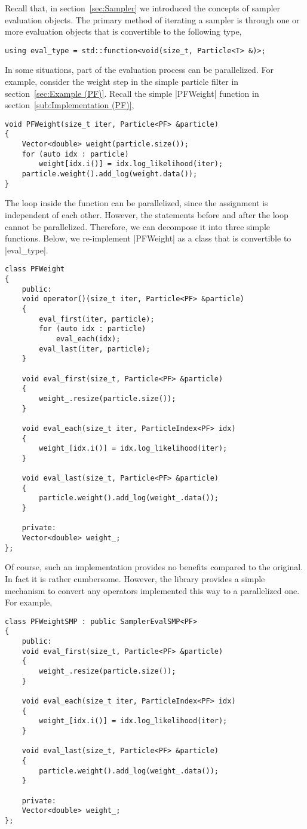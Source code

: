 Recall that, in section~\ref{sec:Sampler} we introduced the concepts of sampler
evaluation objects. The primary method of iterating a sampler is through
one or more evaluation objects that is convertible to the following type,
\begin{verbatim}
using eval_type = std::function<void(size_t, Particle<T> &)>;
\end{verbatim}
In some situations, part of the evaluation process can be parallelized. For
example, consider the weight step in the simple particle filter in
section~\ref{sec:Example (PF)}. Recall the simple |PFWeight| function in
section~\ref{sub:Implementation (PF)},
\begin{verbatim}
void PFWeight(size_t iter, Particle<PF> &particle)
{
    Vector<double> weight(particle.size());
    for (auto idx : particle)
        weight[idx.i()] = idx.log_likelihood(iter);
    particle.weight().add_log(weight.data());
}
\end{verbatim}
The loop inside the function can be parallelized, since the assignment is
independent of each other. However, the statements before and after the loop
cannot be parallelized. Therefore, we can decompose it into three simple
functions. Below, we re-implement |PFWeight| as a class that is convertible to
|eval_type|.
\begin{verbatim}
class PFWeight
{
    public:
    void operator()(size_t iter, Particle<PF> &particle)
    {
        eval_first(iter, particle);
        for (auto idx : particle)
            eval_each(idx);
        eval_last(iter, particle);
    }

    void eval_first(size_t, Particle<PF> &particle)
    {
        weight_.resize(particle.size());
    }

    void eval_each(size_t iter, ParticleIndex<PF> idx)
    {
        weight_[idx.i()] = idx.log_likelihood(iter);
    }

    void eval_last(size_t, Particle<PF> &particle)
    {
        particle.weight().add_log(weight_.data());
    }

    private:
    Vector<double> weight_;
};
\end{verbatim}
Of course, such an implementation provides no benefits compared to the
original. In fact it is rather cumbersome. However, the library provides a
simple mechanism to convert any operators implemented this way to a
parallelized one. For example,
\begin{verbatim}
class PFWeightSMP : public SamplerEvalSMP<PF>
{
    public:
    void eval_first(size_t, Particle<PF> &particle)
    {
        weight_.resize(particle.size());
    }

    void eval_each(size_t iter, ParticleIndex<PF> idx)
    {
        weight_[idx.i()] = idx.log_likelihood(iter);
    }

    void eval_last(size_t, Particle<PF> &particle)
    {
        particle.weight().add_log(weight_.data());
    }

    private:
    Vector<double> weight_;
};
\end{verbatim}
